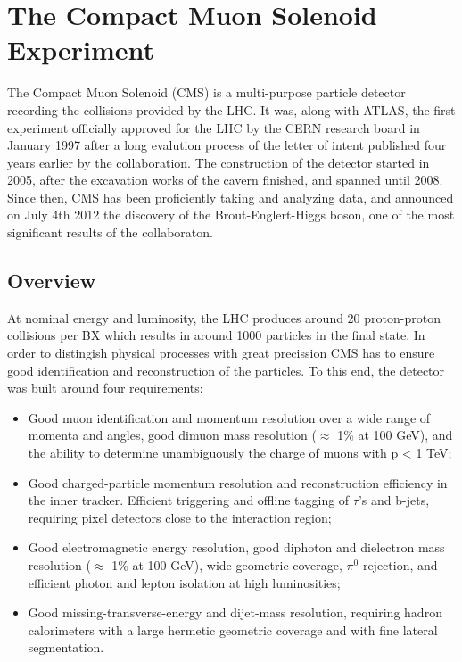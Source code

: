 \chapter{The Compact Muon Solenoid Experiment}
\label{chap:I-3-cms}

	The Compact Muon Solenoid (CMS) \cite{1748-0221-3-08-S08004} is a multi-purpose particle detector recording the collisions provided by the LHC. It was, along with ATLAS, the first experiment officially approved for the LHC by the CERN research board in January 1997 after a long evalution process of the letter of intent published four years earlier by the collaboration. The construction of the detector started in 2005, after the excavation works of the cavern finished, and spanned until 2008. Since then, CMS has been proficiently taking and analyzing data, and announced on July 4th 2012 the discovery of the Brout-Englert-Higgs boson, one of the most significant results of the collaboraton.

  \section{Overview}

    At nominal energy and luminosity, the LHC produces around 20 proton-proton collisions per BX which results in around 1000 particles in the final state. In order to distingish physical processes with great precission CMS has to ensure good identification and reconstruction of the particles. To this end, the detector was built around four requirements:
    \begin{itemize}
      \item Good muon identification and momentum resolution over a wide range of momenta and angles, good dimuon mass resolution ($ \approx $ 1\% at 100 GeV), and the ability to determine unambiguously the charge of muons with p < 1 TeV;
      \item Good charged-particle momentum resolution and reconstruction efficiency in the inner tracker. Efficient triggering and offline tagging of $ \tau $'s and b-jets, requiring pixel detectors close to the interaction region;
      \item Good electromagnetic energy resolution, good diphoton and dielectron mass resolution ($ \approx $ 1\% at 100 GeV), wide geometric coverage, $ \pi^0 $ rejection, and efficient photon and lepton isolation at high luminosities;
      \item Good missing-transverse-energy and dijet-mass resolution, requiring hadron calorimeters with a large hermetic geometric coverage and with fine lateral segmentation. \\
    \end{itemize}

